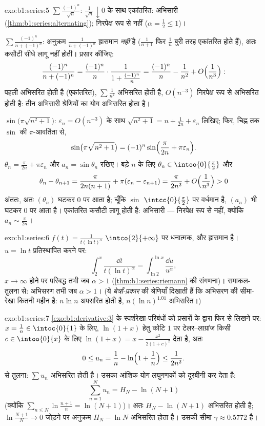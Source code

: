 \begin{solution}{exo:b1:series:5}
$\sum \frac{(-1)^n}{\sqrt n}$: $\frac{1}{\sqrt n} \downarrow 0$ के साथ
एकांतरित: अभिसारी (\cref{thm:b1:series:alternating}); निरपेक्ष रूप से नहीं
($\alpha = \frac12 \leq 1$)।

$\sum \frac{(-1)^n}{n + (-1)^n}$: अनुक्रम $\frac{1}{n + (-1)^n}$ ह्रासमान
\emph{नहीं} है ($\frac{1}{n+1}$ फिर $\frac{1}{n}$ बुरी तरह एकांतरित होते
हैं), अतः कसौटी सीधे लागू नहीं होती। प्रसार कीजिए:
\[
\frac{(-1)^n}{n + (-1)^n}
= \frac{(-1)^n}{n}\cdot\frac{1}{1 + \frac{(-1)^n}{n}}
= \frac{(-1)^n}{n} - \frac{1}{n^2} +
O\Bigl(\frac{1}{n^3}\Bigr):
\]
पहली  अभिसरित होती है (एकांतरित), $\sum \frac{1}{n^2}$ अभिसरित होती
है, $O(n^{-3})$ निरपेक्ष रूप से अभिसरित होती है: तीन अभिसारी श्रेणियों का
योग अभिसरित होता है।

$\sin\bigl(\pi\sqrt{n^2+1}\bigr)$: $\varepsilon_n = O(n^{-3})$ के साथ
$\sqrt{n^2 + 1} = n + \frac{1}{2n} + \varepsilon_n$ लिखिए; फिर, चिह्न तक
$\sin$ की $\pi$-आवर्तिता से,
\[
\sin\bigl(\pi\sqrt{n^2+1}\bigr)
= (-1)^n \sin\Bigl(\frac{\pi}{2n} + \pi\varepsilon_n\Bigr) .
\]
$\theta_n = \frac{\pi}{2n} + \pi\varepsilon_n$ और $a_n = \sin\theta_n$ रखिए।
बड़े $n$ के लिए $\theta_n \in \intoo{0}{\frac\pi2}$ और
\[
\theta_n - \theta_{n+1} = \frac{\pi}{2n(n+1)} +
\pi(\varepsilon_n - \varepsilon_{n+1})
= \frac{\pi}{2n^2} + O\Bigl(\frac{1}{n^3}\Bigr) > 0
\]
अंततः, अतः $(\theta_n)$ घटकर $0$ पर आता है; चूँकि $\sin$
$\intcc{0}{\frac\pi2}$ पर वर्धमान है, $(a_n)$ भी घटकर $0$ पर आता है।
एकांतरित कसौटी लागू होती है: अभिसारी --- निरपेक्ष रूप से नहीं, क्योंकि $a_n
\sim \frac{\pi}{2n}$।
\end{solution}

\begin{solution}{exo:b1:series:6}
$f(t) = \frac{1}{t(\ln t)^\alpha}$ $\intco{2}{+\infty}$ पर धनात्मक,  और
ह्रासमान है। $u = \ln t$ प्रतिस्थापित करने पर:
\[
\int_2^x \frac{\dd t}{t(\ln t)^\alpha}
= \int_{\ln 2}^{\ln x} \frac{\dd u}{u^\alpha},
\]
$x \to \infty$ होने पर परिबद्ध तभी जब $\alpha > 1$
(\cref{thm:b1:series:riemann} की संगणना)। समाकल-तुलना से: अभिसरण तभी जब
$\alpha > 1$। (ये \emph{बेर्त्रां-प्रकार} की श्रेणियाँ दिखाती हैं कि अभिसरण
की सीमा-रेखा कितनी महीन है: $n\ln n$ अपसरित होती है, $n(\ln n)^{1.01}$
अभिसरित।)
\end{solution}

\begin{solution}{exo:b1:series:7}
\cref{exo:b1:derivative:3} के स्पर्शरेखा-परिबंधों को प्रसारों के द्वारा फिर
से लिखने पर: $x = \frac1n \in \intoc{0}{1}$ के लिए, $\ln(1+x)$ हेतु कोटि $1$
पर टेलर--लाग्रांज किसी $c \in \intoo{0}{x}$ के लिए $\ln(1 + x) = x -
\frac{x^2}{2(1 + c)^2}$ देता है, अतः
\[
0 \leq u_n = \frac1n - \ln\Bigl(1 + \frac1n\Bigr) \leq
\frac{1}{2n^2} .
\]
 से तुलना: $\sum u_n$ अभिसरित होती है। उसका आंशिक योग लघुगणकों
को दूरबीनी कर देता है:
\[
\sum_{n=1}^{N} u_n = H_N - \ln(N+1)
\]
(क्योंकि $\sum_{n\leq N} \ln\frac{n+1}{n} = \ln(N+1)$)। अतः $H_N - \ln(N+1)$
अभिसरित होती है; $\ln\frac{N+1}{N} \to 0$ जोड़ने पर अनुक्रम $H_N - \ln N$
अभिसरित होता है। उसकी सीमा $\gamma \approx 0.5772$ है।
\end{solution}

